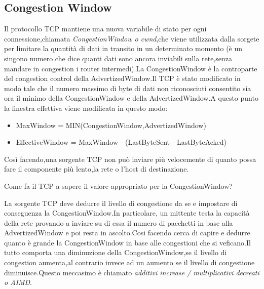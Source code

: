 \subsection{Congestion Window}
Il protocollo TCP mantiene una nuova variabile di stato per ogni connessione,chiamata \textit{CongestionWindow o cwnd},che viene utilizzata dalla sorgete per limitare la quantità di dati in transito in un determinato momento (è un singono numero che dice quanti dati sono ancora inviabili sulla rete,senza mandare in congestion i router intermedi).La CongestionWindow è la controparte del congestion control della AdvertizedWindow.Il TCP è stato modificato in modo tale che il numero massimo di byte di dati non riconosciuti consentito sia ora il minimo della CongestionWindow e della AdvertizedWindow.A questo punto la finestra effettiva viene modificata in questo modo:
\begin{itemize}
  \item MaxWindow = MIN(CongestionWindow,AdvertizedWindow)
  \item EffectiveWindow = MaxWindow - (LastByteSent - LastByteAcked)
\end{itemize}
Così facendo,una sorgente TCP non può inviare più velocemente di quanto possa fare il componente più lento,la rete o l'host di destinazione.
\begin{Question}
  Come fa il TCP a sapere il valore appropriato per la CongestionWindow?
\end{Question}
La sorgente TCP deve dedurre il livello di congestione da se e impostare di conseguenza la CongestionWindow.In particolare, un mittente testa la capacità della rete provando a inviare su di essa il numero di pacchetti in base alla AdvertizedWindow e poi resta in ascolto.Cosi facendo cerca di capire e dedurre quanto è grande la CongestionWindow in base alle congestioni che si veficano.Il tutto comporta una diminuzione della CongestionWindow,se il livello di congestion aumenta,al contrario invece ad un aumento se il livello di congestione diminuisce.Questo meccasimo è chiamato \textit{additivi increase / multiplicativi decreati o AIMD}.
